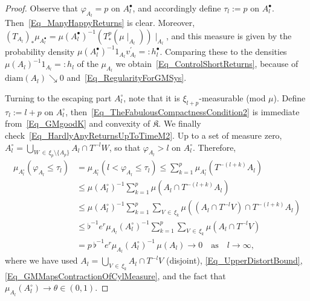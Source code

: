 \documentclass[AHL,Unicode,longabstracts]{cedram}
\newcommand{\diam}{\mathrm{diam}}
\newcommand{\frkK}{\mathfrak{K}}
\begin{document}
\begin{proof}
Observe that $\varphi_{A_{l}}=p$ on $A_{l}^{\bullet}$, and accordingly define $\tau_{l}:=p$ on $A_{l}^{\bullet}$. Then~\eqref{Eq_ManyHappyReturns} is clear. Moreover, $(T_{A_{l}})_{\ast}\mu_{A_{l}^{\bullet}}=\mu(A_{l}^{\bullet})^{-1}\left(T_{\ast}^{p}(\mu\mid_{A_{l}})\right) \mid_{A_{l}}$, and this measure is given by the probability density $\mu(A_{l}^{\bullet})^{-1} 1_{A_{l}}v_{A_{l}}^{\prime}=:h_{l}^{\bullet}$. Comparing these to the densities $\mu(A_{l})^{-1}1_{A_{l}}=:h_{l}$ of the $\mu_{A_{l}}$ we obtain~\eqref{Eq_ControlShortReturns}, because of $\diam(A_{l})\searrow0$ and~\eqref{Eq_RegularityForGMSys}.

Turning to the escaping part $A_{l}^{\circ}$, note that it is $\xi_{l+p} $-measurable (mod $\mu$). Define $\tau_{l}:=l+p$ on $A_{l}^{\circ}$, then~\eqref{Eq_TheFabulousCompactnessCondition2} is immediate from~\eqref{Eq_GMgoodK} and convexity of $\frkK$. We finally check~\eqref{Eq_HardlyAnyReturnsUpToTimeM2}. Up to a set of measure zero, $A_{l}^{\circ}= {\textstyle\bigcup\nolimits_{W\,\in\,\xi_{p}\setminus\{A_{p}\}}} A_{l}\cap T^{-l}W$, so that $\varphi_{A_{l}}>l$ on $A_{l}^{\circ}$. Therefore,
\begin{align*}
\mu_{A_{l}^{\circ}}\left(\varphi_{A_{l}}\leq\tau_{l}\right) & =\mu _{A_{l}^{\circ}}\left(l<\varphi_{A_{l}}\leq\tau_{l}\right) \leq {\textstyle\sum\nolimits_{k=1}^{p}}
\mu_{A_{l}^{\circ}}\left(T^{-(l+k)}A_{l}\right)\\
& \leq\mu\left(A_{l}^{\circ}\right)^{-1} {\textstyle\sum\nolimits_{k=1}^{p}}
\mu\left(A_{l}\cap T^{-(l+k)}A_{l}\right)\\
& \leq\mu\left(A_{l}^{\circ}\right)^{-1} {\textstyle\sum\nolimits_{k=1}^{p}} {\textstyle\sum\nolimits_{V\,\in\,\xi_{k}}}
\mu\left(\left(A_{l}\cap T^{-l}V\right)\cap T^{-(l+k)}A_{l}\right)\\
& \leq\flat^{-1}e^{r}\mu_{A_{l}}\left(A_{l}^{\circ}\right)^{-1} {\textstyle\sum\nolimits_{k=1}^{p}} {\textstyle\sum\nolimits_{V\,\in\,\xi_{k}}}
\mu\left(A_{l}\cap T^{-l}V\right) \\
& =p\,\flat^{-1}e^{r}\mu_{A_{l}}\left(A_{l}^{\circ}\right)^{-1}\,\mu(A_{l})\longrightarrow0\quad\text{as}\quad l\rightarrow\infty,
\end{align*}
where we have used $A_{l}= {\textstyle\bigcup\nolimits_{V\,\in\,\xi_{k}}} A_{l}\cap T^{-l}V$ (disjoint), \eqref{Eq_UpperDistortBound}, \eqref{Eq_GMMapsContractionOfCylMeasure}, and the fact that $\mu_{A_{l}} (A_{l}^{\circ})\rightarrow\theta\in(0,1)$.
\end{proof}
\end{document}
